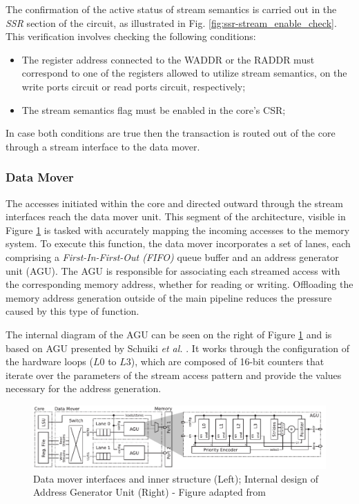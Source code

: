 The confirmation of the active status of stream semantics is carried out in the \textit{SSR} section of the circuit, as illustrated in Fig. \ref{fig:ssr-stream_enable_check}. This verification involves checking the following conditions:

\begin{itemize}
\item[1] The register address connected to the WADDR or the RADDR must correspond to one of the registers allowed to utilize stream semantics, on the write ports circuit or read ports circuit, respectively;
\item[2] The stream semantics flag must be enabled in the core's CSR;
\end{itemize}

In case both conditions are true then the transaction is routed out of the core through a stream interface to the data mover.

\subsubsection{Data Mover}

The accesses initiated within the core and directed outward through the stream interfaces reach the data mover unit. This segment of the architecture, visible in Figure \ref{fig:ssr-data_mover} is tasked with accurately mapping the incoming accesses to the memory system. To execute this function, the data mover incorporates a set of lanes, each comprising a \textit{First-In-First-Out (FIFO)} queue buffer and an address generator unit (AGU). The AGU is responsible for associating each streamed access with the corresponding memory address, whether for reading or writing. Offloading the memory address generation outside of the main pipeline reduces the pressure caused by this type of function.

The internal diagram of the AGU can be seen on the right of Figure \ref{fig:ssr-data_mover} and is based on AGU presented by Schuiki \textit{et al.} \cite{8502059}. It works through the configuration of the hardware loops ($L0$ to $L3$), which are composed of 16-bit counters that iterate over the parameters of the stream access pattern and provide the values necessary for the address generation. 

\begin{figure}[H]
	\begin{center}
 		\includegraphics[width=0.87\linewidth]{images/ssr-data_mover.pdf}
 		\caption{Data mover interfaces and inner structure (Left); Internal design of Address Generator Unit (Right) - Figure adapted from \cite{9068465}}
 		\label{fig:ssr-data_mover}
	\end{center} 
\end{figure}

